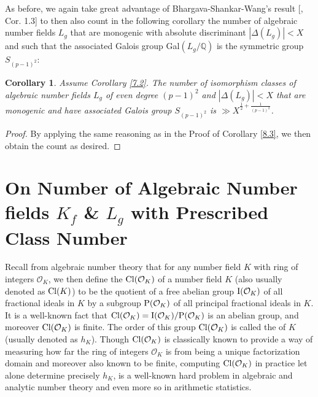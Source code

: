 \documentclass{article}
\theoremstyle{plain}
\newtheorem{cor}[thm]{Corollary}
\theoremstyle{definition}
\begin{document}
As before, we again take great advantage of Bhargava-Shankar-Wang's result [\cite{sch1}, Cor. 1.3] to then also count in the following corollary the number of algebraic number fields $L_{g}$ that are monogenic with absolute discriminant $|\Delta(L_{g})| < X$ and such that the associated Galois group Gal$(L_{g}\slash \mathbb{Q})$ is the symmetric group $S_{(p-1)^2}$: 

\begin{cor}
Assume Corollary \ref{7.2}. The number of isomorphism classes of algebraic number fields $L_{g}$ of even degree $(p-1)^2$ and $|\Delta(L_{g})| < X$ that are monogenic and have associated Galois group $S_{(p-1)^2}$ is $\gg X^{\frac{1}{2} + \frac{1}{(p-1)^2}}$.
\end{cor}

\begin{proof}
By applying the same reasoning as in the Proof of Corollary \ref{8.3}, we then obtain the count as desired.
\end{proof}

\section{On Number of Algebraic Number fields $K_{f}$ \& $L_{g}$ with Prescribed Class Number}\label{sec9}

Recall from algebraic number theory that for any number field $K$ with ring of integers $\mathcal{O}_{K}$, we then define the  $\textnormal{Cl}(\mathcal{O}_{K})$ of a number field $K$ (also usually denoted as $\textnormal{Cl}(K)$) to be the quotient of a free abelian group $\textnormal{I}(\mathcal{O}_{K})$ of all fractional ideals in $K$ by a subgroup $\textnormal{P}(\mathcal{O}_{K})$ of all principal fractional ideals in $K$. It is a well-known fact that $\textnormal{Cl}(\mathcal{O}_{K})= \textnormal{I}(\mathcal{O}_{K})\slash \textnormal{P}(\mathcal{O}_{K})$ is an abelian group, and moreover $\textnormal{Cl}(\mathcal{O}_{K})$ is finite. The order of this group $\textnormal{Cl}(\mathcal{O}_{K})$ is called the  of $K$ (usually denoted as $h_{K}$). Though $\textnormal{Cl}(\mathcal{O}_{K})$ is classically known to provide a way of measuring how far the ring of integers $\mathcal{O}_{K}$ is from being a unique factorization domain and moreover also known to be finite, computing $\textnormal{Cl}(\mathcal{O}_{K})$ in practice let alone determine precisely $h_{K}$, is a well-known hard problem in algebraic and analytic number theory and even more so in arithmetic statistics. 
\end{document}
